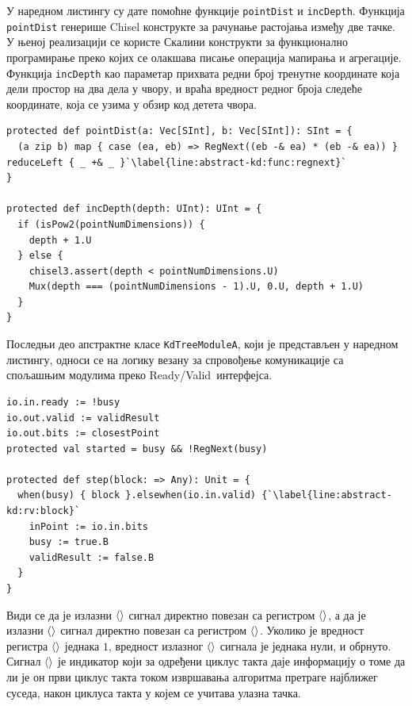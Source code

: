\documentclass[master]{finthesis}
\newcommand*{\correctmath}[1]{%
    \ifcsname mathCorrectionFor#1\endcsname%
        \csname mathCorrectionFor#1\endcsname%
    \else%
        #1%
    \fi%
}
\newcommand*{\mfield}[1]{{\langle\correctmath{#1}\/\rangle}}
\newcommand*{\field}[1]{\texorpdfstring{$\mfield{#1}$}{⟨#1⟩}}
\newcommand{\rv}{Ready\slash Valid}
\newcommand*{\prog}[1]{\texttt{#1}}
\newcommand*{\func}[1]{\prog{#1}}
\begin{document}
У наредном листингу су дате помоћне функције \func{pointDist} и \func{incDepth}. Функција \func{pointDist} генерише Chisel конструкте за рачунање растојања између две тачке. У њеној реализацији се користе Скалини конструкти за функционално програмирање преко којих се олакшава писање операција мапирања и агрегације. Функција \func{incDepth} као параметар прихвата редни број тренутне координате која дели простор на два дела у чвору, и враћа вредност редног броја следеће координате, која се узима у обзир код детета чвора.

\begin{lstlisting}[style=Chisel, caption={Реализација помоћних функција \func{pointDist} и \func{incDepth} у оквиру класе \prog{KdTreeModuleA}.}, label={lst:abstract-kd:func}]
protected def pointDist(a: Vec[SInt], b: Vec[SInt]): SInt = {
  (a zip b) map { case (ea, eb) => RegNext((eb -& ea) * (eb -& ea)) } reduceLeft { _ +& _ }`\label{line:abstract-kd:func:regnext}`
}

protected def incDepth(depth: UInt): UInt = {
  if (isPow2(pointNumDimensions)) {
    depth + 1.U
  } else {
    chisel3.assert(depth < pointNumDimensions.U)
    Mux(depth === (pointNumDimensions - 1).U, 0.U, depth + 1.U)
  }
}
\end{lstlisting}

Последњи део апстрактне класе \prog{KdTreeModuleA}, који је представљен у наредном листингу, односи се на логику везану за спровођење комуникације са спољашњим модулима преко \rv\ интерфејса.

\begin{lstlisting}[style=Chisel, caption={Реализација логике \rv\ интерфејса у оквиру апстрактне класе \prog{KdTreeModuleA}.}, label={lst:abstract-kd:rv}]
io.in.ready := !busy
io.out.valid := validResult
io.out.bits := closestPoint
protected val started = busy && !RegNext(busy)

protected def step(block: => Any): Unit = {
  when(busy) { block }.elsewhen(io.in.valid) {`\label{line:abstract-kd:rv:block}`
    inPoint := io.in.bits
    busy := true.B
    validResult := false.B
  }
}
\end{lstlisting}

Види се да је излазни \field{bits} сигнал директно повезан са регистром \field{closestPoint}, а да је излазни \field{valid} сигнал директно повезан са регистром \field{validResult}. Уколико је вредност регистра \field{busy} једнака $1$, вредност излазног \field{ready} сигнала је једнака нули, и обрнуто. Сигнал \field{started} је индикатор који за одређени циклус такта даје информацију о томе да ли је он први циклус такта током извршавања алгоритма претраге најближег суседа, након циклуса такта у којем се учитава улазна тачка.
\end{document}

